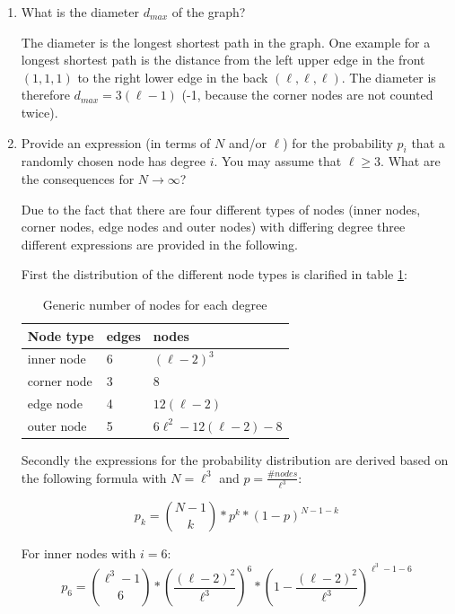 \begin{enumerate}
	\item What is the diameter $d_{max}$ of the graph?
	\vspace{0.25cm}
	
	The diameter is the longest shortest path in the graph. One example for a longest shortest path is the distance from the left upper edge in the front $(1,1,1)$ to the right lower edge in the back $(\ell,\ell,\ell)$. The diameter is therefore $d_{max} = 3(\ell-1)$ (-1, because the corner nodes are not counted twice).
	
	\item Provide an expression (in terms of $N$ and/or $\ell$) for the probability $p_i$ that a randomly chosen node has degree $i$. You may assume that $\ell \geq 3$. What are the consequences for $N \rightarrow \infty$?
	\vspace{0.25cm}
	
	Due to the fact that there are four different types of nodes (inner nodes, corner nodes, edge nodes and outer nodes) with differing degree three different expressions are provided in the following.
	
	First the distribution of the different node types is clarified in table \ref{tab:node_distribution}:
	
	\begin{table}[h]
	\centering
	\begin{tabular}{l|l|l}
		\hline
		\rowcolor{lightgray}
		Node type & edges & nodes \\ 
		\hline
		inner node    & 6 & $(\ell-2)^3$ \\
		\hline
		corner node    & 3 & $8$ \\
		\hline
		edge node    & 4  & $12(\ell - 2)$ \\
		\hline
		outer node    & 5  & $6\ell^2 - 12(\ell - 2) - 8$ \\
		\hline
	\end{tabular}
	\caption{Generic number of nodes for each degree}
	\label{tab:node_distribution}
	\end{table}

	Secondly the expressions for the probability distribution are derived based on the following formula with $N=\ell^3$ and $p=\frac{\#nodes}{\ell^3}$:
	
	\begin{equation*}
		p_k = {{N-1}\choose{k}} * p^k * (1-p)^{N-1-k}
	\end{equation*}
	
	For inner nodes with $i=6$:
	\begin{equation*}
		p_6 = {{\ell^3-1}\choose{6}} * (\frac{(\ell-2)^2}{\ell^3})^6 * (1-{\frac{(\ell-2)^2}{\ell^3}})^{\ell^3-1-6}
	\end{equation*}
	

\end{enumerate}
